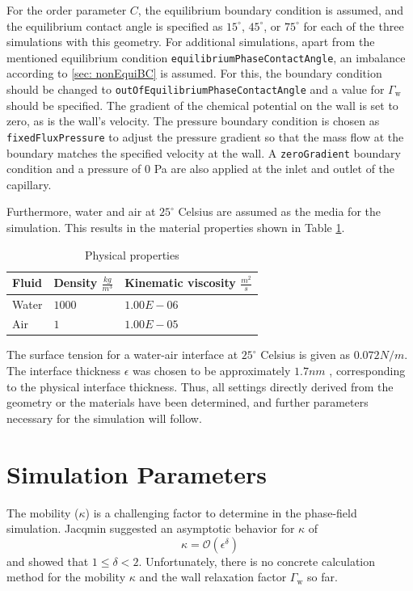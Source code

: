 For the order parameter $C$, the equilibrium boundary condition is assumed, and the equilibrium contact angle is specified as $15^{\circ}$, $45^{\circ}$, or $75^{\circ}$ for each of the three simulations with this geometry. For additional simulations, apart from the mentioned equilibrium condition \texttt{equilibriumPhaseContactAngle}, an imbalance according to \ref{sec: nonEquiBC} is assumed. For this, the boundary condition should be changed to \texttt{outOfEquilibriumPhaseContactAngle} and a value for $\Gamma_{\mathrm{w}}$ should be specified. The gradient of the chemical potential on the wall is set to zero, as is the wall's velocity. The pressure boundary condition is chosen as \texttt{fixedFluxPressure} to adjust the pressure gradient so that the mass flow at the boundary matches the specified velocity at the wall. A \texttt{zeroGradient} boundary condition and a pressure of $0$ Pa are also applied at the inlet and outlet of the capillary.

Furthermore, water and air at $25^{\circ}$ Celsius are assumed as the media for the simulation. This results in the material properties shown in Table \ref{tab:physicalProperties_CaseSetup}.

\begin{table}[h]
    \centering
    \caption{Physical properties}
    \label{tab:physicalProperties_CaseSetup}
    \begin{tabular}{lll}
    Fluid & Density $\frac{kg}{m^3}$ & Kinematic viscosity $\frac{m^2}{s}$ \\ \hline
    Water & $1000$                     & $1.00E-06$                          \\
    Air   & $1$                        & $1.00E-05$                          \\ 
    \end{tabular}
    \end{table}

The surface tension for a water-air interface at $25^{\circ}$ Celsius is given as \(0.072 N/m\). The interface thickness \( \epsilon \) was chosen to be approximately \(1.7 nm\) \cite{bagheriInterfacialRelaxationCrucial2022}, corresponding to the physical interface thickness. Thus, all settings directly derived from the geometry or the materials have been determined, and further parameters necessary for the simulation will follow.

\section{Simulation Parameters}
The mobility ($\kappa$) is a challenging factor to determine in the phase-field simulation. Jacqmin \cite{jacqmin1999CalculationTwoPhaseNavier} suggested an asymptotic behavior for \( \kappa \) of 
\begin{equation}
    \kappa = \mathcal{O}(\epsilon^{\delta})
\end{equation}
and showed that \( 1 \leq \delta < 2 \). Unfortunately, there is no concrete calculation method for the mobility $\kappa$ and the wall relaxation factor $\Gamma_{\mathrm{w}}$ so far.


